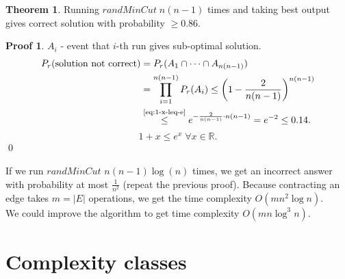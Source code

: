 \documentclass[a4paper, 12pt]{book}
\theoremstyle{definition}
\newtheorem{theorem}[counter]{Theorem}
\newtheorem{pro}[counter]{Proof}
\theoremstyle{remark}
\newcommand{\R}{\mathbb{R}}
\begin{document}
\begin{theorem}
  Running $randMinCut \; n(n-1)$ times and taking best output gives correct solution with probability $\geq 0.86$.
\end{theorem}
\begin{pro}
  $A_i$ - event that $i$-th run gives sub-optimal solution.
  \begin{align*}
    P_r(\text{solution not correct}) &= P_r(A_1 \cap \dots \cap A_{n(n-1)}) \\
    &= \prod_{i=1}^{n(n-1)} P_r(A_i) \leq \left(1 - \frac{2}{n(n-1)}\right)^{n(n-1)} \\
    &\stackrel{\refeq{eq:1-x-leq-e}}{\leq} e^{-\frac{2}{n(n-1)} \cdot n(n-1)} = e^{-2} \leq 0.14.
  \end{align*}
  \begin{equation}
    \label{eq:1-x-leq-e}
    1 + x \leq e^x \; \forall x \in \R.
  \end{equation}
  \qed
\end{pro}
If we run $randMinCut$ $n(n-1) \log(n)$ times, we get an incorrect answer with probability at most $\frac{1}{n^2}$ (repeat the previous proof). Because contracting an edge takes
$m = |E|$ operations, we get the time complexity $O\left(mn^2 \log n\right)$.\\
We could improve the algorithm to get time complexity $O\left(mn \log^3 n\right)$.



\chapter{Complexity classes}
\end{document}
